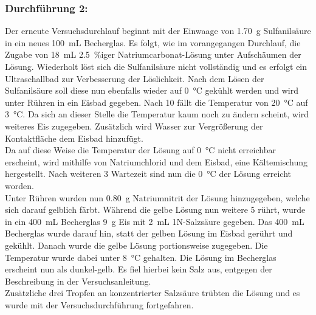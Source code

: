 \subsubsection*{Durchführung 2:}
Der erneute Versuchsdurchlauf beginnt mit der Einwaage von \SI{1,70}{\gram} Sulfanilsäure in ein neues \SI{100}{\milli \liter} Becherglas. Es folgt, wie im vorangegangen Durchlauf, die Zugabe von \SI{18}{\milli \liter} \SI{2,5}{\percent}iger Natriumcarbonat-Lösung unter Aufschäumen der Lösung. Wiederholt löst sich die Sulfanilsäure nicht vollständig und es erfolgt ein Ultraschallbad zur Verbesserung der Löslichkeit. Nach dem Lösen der Sulfanilsäure soll diese nun ebenfalls wieder auf \SI{0}{\celsius} gekühlt werden und wird unter Rühren in ein Eisbad gegeben. Nach \SI{10}{\min} fällt die Temperatur von \SI{20}{\celsius} auf \SI{3}{\celsius}. Da sich an dieser Stelle die Temperatur kaum noch zu ändern scheint, wird weiteres Eis zugegeben. Zusätzlich wird Wasser zur Vergrößerung der Kontaktfläche dem Eisbad hinzufügt.\\
Da auf diese Weise die Temperatur der Lösung auf \SI{0}{\celsius} nicht erreichbar erscheint, wird mithilfe von Natriumchlorid und dem Eisbad, eine Kältemischung hergestellt. Nach weiteren \SI{3}{\min} Wartezeit sind nun die \SI{0}{\celsius} der Lösung erreicht worden.\\
Unter Rühren wurden nun \SI{0,80}{\gram} Natriumnitrit der Lösung hinzugegeben, welche sich darauf gelblich färbt. Während die gelbe Lösung nun weitere \SI{5}{\min} rührt, wurde  in ein \SI{400}{\milli \liter} Becherglas \SI{9}{\gram} Eis mit \SI{2}{\milli \liter} 1N-Salzsäure gegeben. Das \SI{400}{\milli \liter} Becherglas wurde darauf hin, statt der gelben Lösung im Eisbad gerührt und gekühlt. Danach wurde die gelbe Lösung portionsweise zugegeben. Die Temperatur wurde dabei unter \SI{8}{\celsius} gehalten. Die Lösung im Becherglas erscheint nun als dunkel-gelb. Es fiel hierbei kein Salz aus, entgegen der Beschreibung in der Versuchsanleitung.\\
Zusätzliche drei Tropfen an konzentrierter Salzsäure trübten die Lösung und es wurde mit der Versuchsdurchführung fortgefahren. \\


